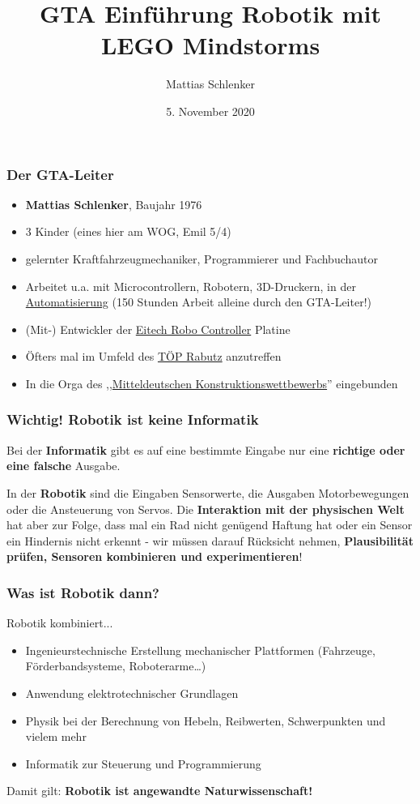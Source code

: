 \documentclass{beamer}
\title{GTA Einführung Robotik mit LEGO Mindstorms}
\author{Mattias Schlenker}
\institute{Wilhelm-Ostwald-Gymnasium}
\date{5. November 2020}
\begin{document}
\frame{\titlepage}

\begin{frame}
\frametitle{Der GTA-Leiter}
\begin{itemize}
\item \textbf{Mattias Schlenker}, Baujahr 1976
\item 3 Kinder (eines hier am WOG, Emil 5/4) 
\item gelernter Kraftfahrzeugmechaniker, Programmierer und Fachbuchautor 
\item Arbeitet u.a. mit Microcontrollern, Robotern, 3D-Druckern, in der \href{https://www.computerbild.de/artikel/cb-Tests-Handy-So-testet-COMPUTER-BILD-Smartphones-25287581.html}{Automatisierung} (150 Stunden Arbeit alleine durch den GTA-Leiter!)
\item (Mit-) Entwickler der \href{https://www.youtube.com/watch?v=-ncd1DkRh1M}{Eitech Robo Controller} Platine  
\item Öfters mal im Umfeld des \href{http://www.projektzentrum-rabutz.de/}{TÖP Rabutz} anzutreffen
\item In die Orga des ,,\href{https://www.salinetechnikum.de/veranstaltungen/mitteldeutscher-konstruktionswettbewerb/3-mdkw-2019/}{Mitteldeutschen Konstruktionswettbewerbs}'' eingebunden
\end{itemize}
\end{frame}

\begin{frame}
\frametitle{Wichtig! Robotik ist keine Informatik}

Bei der \textbf{Informatik} gibt es auf eine bestimmte Eingabe nur eine \textbf{richtige oder eine falsche} Ausgabe.

In der \textbf{Robotik} sind die Eingaben Sensorwerte, die Ausgaben Motorbewegungen oder die Ansteuerung von Servos. Die \textbf{Interaktion mit der physischen Welt} hat aber zur Folge, dass mal ein Rad nicht genügend Haftung hat oder ein Sensor ein Hindernis nicht erkennt - wir müssen darauf Rücksicht nehmen, \textbf{Plausibilität prüfen, Sensoren kombinieren und experimentieren}!
\end{frame}

\begin{frame}

\frametitle{Was ist Robotik dann?}

Robotik kombiniert...

\begin{itemize}
\item  Ingenieurstechnische Erstellung mechanischer Plattformen (Fahrzeuge, Förderbandsysteme, Roboterarme…)
\item  Anwendung elektrotechnischer Grundlagen 
\item Physik bei der Berechnung von Hebeln, Reibwerten, Schwerpunkten und vielem mehr
\item Informatik zur Steuerung und Programmierung
\end{itemize}

Damit gilt: \textbf{Robotik ist angewandte Naturwissenschaft!} 
\end{frame}
\end{document}
